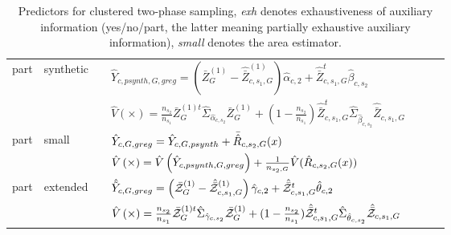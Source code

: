 \begin{table}
\begin{tabular}{l l l l l r l}
			
\strongrule
	 part 	&  synthetic 	& \analogy{} & $\hat{Y}_{c,psynth, G,greg} = \left(
\bar{Z}_G^{(1)}- \hat{\bar{Z}}_{c,s_1,G}^{(1)}\right) \hat{\alpha}_{c,2} + \hat{\bar{Z}}^t_{c,s_1,G}\hat{\beta}_{c,s_2}  $\\
	   	&    	&     \analogy{} & $ \hat{V}\left(\times\right) = \frac{n_{s_2}}{n_{s_1}}\bar{Z}^{(1)t}_G \hat{\Sigma}_{ \hat{\alpha}_{c,s_2}} \bar{Z}^{(1)}_G + (1-\frac{n_{s_2}}{n_{s_1}})\hat{\bar{Z}}^{t}_{c,s_1,G} \hat{\Sigma}_{ \hat{\beta}_{c,s_2}} \hat{\bar{Z}}_{c,s_1,G} $\\
\lightrule
			
 	 part 	&  small 	& \analogy{} & $ \hat{Y}_{c,G,greg} = \hat{Y}_{c,G,psynth} + \bar{\hat{R}}_{c,s_2,G}(x) $\\
	    	&      	& \analogy{} & $ \hat{V}\left(\times\right)  = \hat{V}\left(\hat{Y}_{c,psynth, G,greg}\right)  + \frac{1}{n_{s_2,G}}\hat{V}(\hat{R}_{c,s_2,G}(x))$\\
\lightrule
     part 	&  extended 	& \cite[eq. 50]{Man13b.e} & $\hat{\tilde{Y}}_{c,G,greg} = \left( \bar{\mathcal{Z}}_G^{(1)}- \hat{\bar{\mathcal{Z}}}_{c,s_1,G}^{(1)}\right) \hat{\gamma}_{c,2} + \hat{\bar{\mathcal{Z}}}^t_{c,s_1,G}\hat{\theta}_{c,2} $\\
        &    	&     \cite[eq. 52]{Man13b.e} &$\hat{V}\left(\times\right) = \frac{n_{s_2}}{n_{s_1}}\bar{\mathcal{Z}}^{(1)t}_G \hat{\Sigma}_{ \hat{\gamma}_{c,s_2}} \bar{\mathcal{Z}}^{(1)}_G + (1-\frac{n_{s_2}}{n_{s_1}})\hat{\bar{\mathcal{Z}}}^{t}_{c,s_1,G}
\hat{\Sigma}_{ \hat{\theta}_{c,s_2}} \hat{\bar{\mathcal{Z}}}_{c,s_1,G} $\\
\end{tabular}
\caption{Predictors for clustered two-phase sampling, 
    \emph{exh} denotes exhaustiveness of auxiliary information (yes/no/part, the
    latter meaning partially exhaustive auxiliary information),
    \emph{small} denotes the area estimator. \label{tab:clustered2}
}
\end{table}
